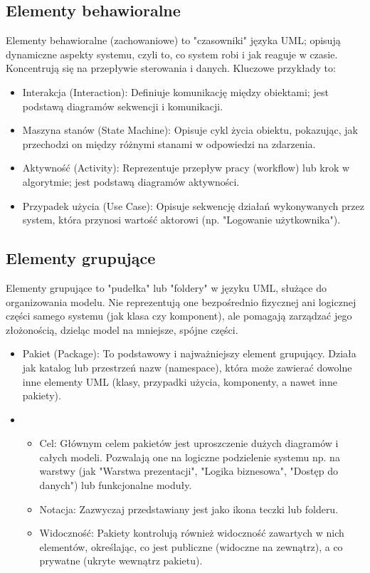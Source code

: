 \documentclass[a4paper,12pt]{article}
\begin{document}
\subsection{Elementy behawioralne}
Elementy behawioralne (zachowaniowe) to "czasowniki" języka UML; opisują dynamiczne aspekty systemu, czyli to, co system robi i jak reaguje w czasie. Koncentrują się na przepływie sterowania i danych. Kluczowe przykłady to:
\begin{itemize}
\item Interakcja (Interaction): Definiuje komunikację między obiektami; jest podstawą diagramów sekwencji i komunikacji.
\item Maszyna stanów (State Machine): Opisuje cykl życia obiektu, pokazując, jak przechodzi on między różnymi stanami w odpowiedzi na zdarzenia.
\item Aktywność (Activity): Reprezentuje przepływ pracy (workflow) lub krok w algorytmie; jest podstawą diagramów aktywności.
\item Przypadek użycia (Use Case): Opisuje sekwencję działań wykonywanych przez system, która przynosi wartość aktorowi (np. "Logowanie użytkownika").
\end{itemize}

\subsection{Elementy grupujące}
Elementy grupujące to "pudełka" lub "foldery" w języku UML, służące do organizowania modelu. Nie reprezentują one bezpośrednio fizycznej ani logicznej części samego systemu (jak klasa czy komponent), ale pomagają zarządzać jego złożonością, dzieląc model na mniejsze, spójne części.
\begin{itemize}
\item Pakiet (Package): To podstawowy i najważniejszy element grupujący. Działa jak katalog lub przestrzeń nazw (namespace), która może zawierać dowolne inne elementy UML (klasy, przypadki użycia, komponenty, a nawet inne pakiety).
\item \begin{itemize}
\item Cel: Głównym celem pakietów jest uproszczenie dużych diagramów i całych modeli. Pozwalają one na logiczne podzielenie systemu np. na warstwy (jak "Warstwa prezentacji", "Logika biznesowa", "Dostęp do danych") lub funkcjonalne moduły.
\item Notacja: Zazwyczaj przedstawiany jest jako ikona teczki lub folderu.
\item Widoczność: Pakiety kontrolują również widoczność zawartych w nich elementów, określając, co jest publiczne (widoczne na zewnątrz), a co prywatne (ukryte wewnątrz pakietu).
\end{itemize}
\end{itemize}
\end{document}
